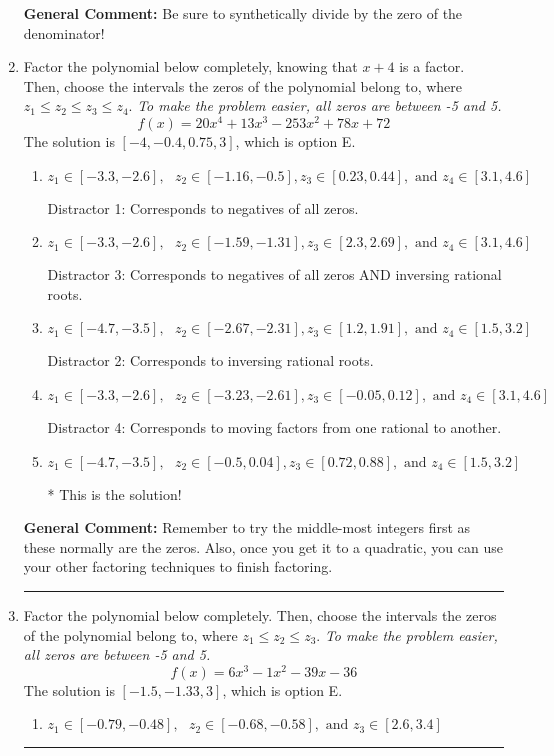 \documentclass{extbook}[14pt]
\newcommand{\litem}[1]{\item #1

\rule{\textwidth}{0.4pt}}
\begin{document}
\begin{enumerate}
{\textbf{General Comment:} Be sure to synthetically divide by the zero of the denominator!
}
\litem{
Factor the polynomial below completely, knowing that $x + 4$ is a factor. Then, choose the intervals the zeros of the polynomial belong to, where $z_1 \leq z_2 \leq z_3 \leq z_4$. \textit{To make the problem easier, all zeros are between -5 and 5.}
\[ f(x) = 20x^{4} +13 x^{3} -253 x^{2} +78 x + 72 \]The solution is \( [-4, -0.4, 0.75, 3] \), which is option E.\begin{enumerate}[label=\Alph*.]
\item \( z_1 \in [-3.3, -2.6], \text{   }  z_2 \in [-1.16, -0.5], z_3 \in [0.23, 0.44], \text{   and   } z_4 \in [3.1, 4.6] \)

 Distractor 1: Corresponds to negatives of all zeros.
\item \( z_1 \in [-3.3, -2.6], \text{   }  z_2 \in [-1.59, -1.31], z_3 \in [2.3, 2.69], \text{   and   } z_4 \in [3.1, 4.6] \)

 Distractor 3: Corresponds to negatives of all zeros AND inversing rational roots.
\item \( z_1 \in [-4.7, -3.5], \text{   }  z_2 \in [-2.67, -2.31], z_3 \in [1.2, 1.91], \text{   and   } z_4 \in [1.5, 3.2] \)

 Distractor 2: Corresponds to inversing rational roots.
\item \( z_1 \in [-3.3, -2.6], \text{   }  z_2 \in [-3.23, -2.61], z_3 \in [-0.05, 0.12], \text{   and   } z_4 \in [3.1, 4.6] \)

 Distractor 4: Corresponds to moving factors from one rational to another.
\item \( z_1 \in [-4.7, -3.5], \text{   }  z_2 \in [-0.5, 0.04], z_3 \in [0.72, 0.88], \text{   and   } z_4 \in [1.5, 3.2] \)

* This is the solution!
\end{enumerate}

\textbf{General Comment:} Remember to try the middle-most integers first as these normally are the zeros. Also, once you get it to a quadratic, you can use your other factoring techniques to finish factoring.
}
\litem{
Factor the polynomial below completely. Then, choose the intervals the zeros of the polynomial belong to, where $z_1 \leq z_2 \leq z_3$. \textit{To make the problem easier, all zeros are between -5 and 5.}
\[ f(x) = 6x^{3} -1 x^{2} -39 x -36 \]The solution is \( [-1.5, -1.33, 3] \), which is option E.\begin{enumerate}[label=\Alph*.]
\item \( z_1 \in [-0.79, -0.48], \text{   }  z_2 \in [-0.68, -0.58], \text{   and   } z_3 \in [2.6, 3.4] \)


\end{enumerate}}
\end{enumerate}
\end{document}
